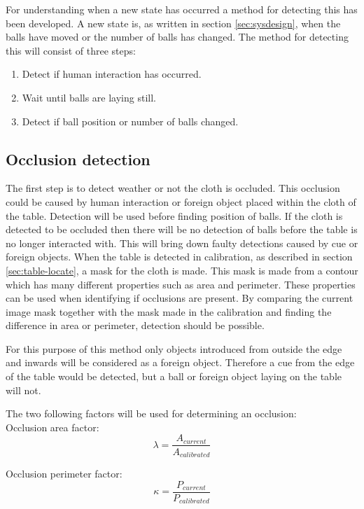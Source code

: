 For understanding when a new state has occurred a method for detecting this has been developed. A new state is, as written in section \ref{sec:sysdesign}, when the balls have moved or the number of balls has changed. The method for detecting this will consist of three steps:
\begin{enumerate}
	\item Detect if human interaction has occurred.
	\item Wait until balls are laying still.
	\item Detect if ball position or number of balls changed.
\end{enumerate}

\subsection{Occlusion detection}
The first step is to detect weather or not the cloth is occluded. This occlusion could be caused by human interaction or foreign object placed within the cloth of the table. Detection will be used before finding position of balls. If the cloth is detected to be occluded then there will be no detection of balls before the table is no longer interacted with. This will bring down faulty detections caused by cue or foreign objects. When the table is detected in calibration, as described in section \ref{sec:table-locate}, a mask for the cloth is made. This mask is made from a contour which has many different properties such as area and perimeter. These properties can be used when identifying if occlusions are present. By comparing the current image mask together with the mask made in the calibration and finding the difference in area or perimeter, detection should be possible.

For this purpose of this method only objects introduced from outside the edge and inwards will be considered as a foreign object. Therefore a cue from the edge of the table would be detected, but a ball or foreign object laying on the table will not.

The two following factors will be used for determining an occlusion:\\

Occlusion area factor:
\begin{equation}
\lambda = \frac{A_{current}}{A_{calibrated}}
\label{eq:area}
\end{equation}

Occlusion perimeter factor:
\begin{equation}
\kappa = \frac{P_{current}}{P_{calibrated}}
\label{eq:perimeter}
\end{equation}

